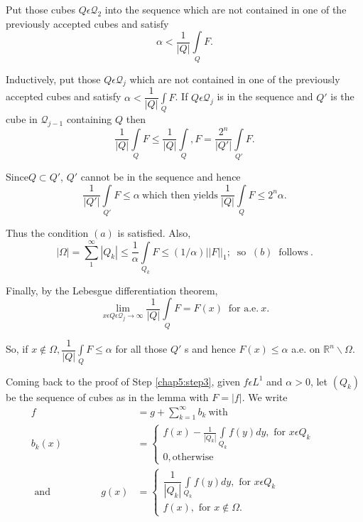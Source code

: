 Put those cubes $Q \epsilon \mathscr{Q}_2$ into the sequence which
are not contained in one of the previously accepted cubes and satisfy 
$$
\alpha < \frac{1}{| Q |} \int\limits_{Q} F.
$$


Inductively, put those $Q \epsilon \mathscr{Q}_j$ which are not
contained in one of the previously accepted cubes and satisfy $\alpha
< \dfrac{1}{| Q |} \int\limits_{Q} F$. If $Q \epsilon
\mathscr{Q}_j$ is in the sequence and $Q'$ is the cube in
$\mathscr{Q}_{j-1}$ containing $Q$ then  
$$
\frac{1}{| Q |} \int\limits_{Q} F \le \frac{1}{| Q |} \int\limits_{Q},
F = \frac{2^n}{| Q'|} \int\limits_{Q'} F. 
$$

Since\pageoriginale $Q \subset Q'$, $Q'$ cannot be in the sequence and hence 
$$
\frac{1}{| Q' |} \int\limits_{Q'} F \le \alpha ~\text{which then
  yields}~ \frac{1}{|Q |} \int\limits_{Q} F \le 2^n \alpha. 
$$

Thus the condition $(a)$ is satisfied. Also,
$$
| \Omega | = \sum_{1}^{\infty} | Q_k | \le \frac{1}{\alpha}
\int\limits_{Q_k} F \le (1/\alpha) || F ||_1 ; ~\text{ so }~ (b)
~\text{ follows}~.  
$$

Finally, by the Lebesgue differentiation theorem,
$$
\lim_{x \epsilon Q \epsilon \mathscr{Q}_j \to \infty}
\frac{1}{| Q |} \int\limits_{Q} F = F (x) ~\text{ for  a.e.}~ x. 
$$

So, if $x \notin \Omega, \dfrac{1}{| Q |} \int\limits_{Q} F \le
\alpha$ for all those $Q'$ s and hence $F(x) \le \alpha $ a.e. on
$\mathbb{R}^{n} \backslash \Omega$. 

Coming back to the proof of Step \ref{chap5:step3}, given $f \epsilon L^1$ and
$\alpha > 0$, let $(Q_k)$ be the sequence of cubes as in the lemma
with $F = | f |$. We write 
\begin{align*}
  f & = g + \sum_{k=1}^{\infty} b_k ~\text{with}\\
  b_k (x) &=
  \begin{cases}
    f (x) - \frac{1}{|Q_k|} \int\limits_{Q_k} f(y) dy, \text { for } x
    \epsilon Q_k\\ 
    0, \text {otherwise}
  \end{cases}\hspace{1cm}\\
  \text { and } \hspace{2cm}g(x) &=
  \begin{cases}
    \dfrac{1}{| Q_k |} \int\limits_{Q_k} f(y) dy, \text { for } x \epsilon Q_k\\
    f(x), \text { for } x \notin \Omega.
  \end{cases}
\end{align*}

